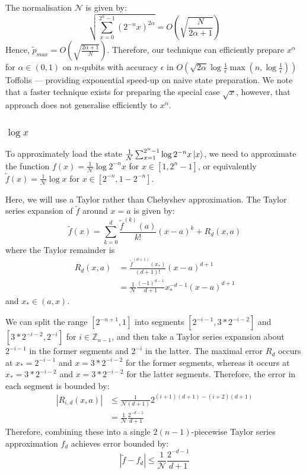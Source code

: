 \documentclass[a4paper,twocolumn,,accepted=2025-05-27]{quantumarticle}
\theoremstyle{empty}
\begin{document}
The normalisation $\mathcal{N}$ is given by:
\begin{equation}
    \sqrt{\sum_{x=0}^{2^n-1}(2^{-n} x)^{2\alpha}}  = O\left(\sqrt{\frac{N}{2\alpha+1}}\right)
\end{equation}
Hence, $\tilde{p}_{max} = O\left(\sqrt{\frac{2\alpha+1}{N}
}\right)$. Therefore, our technique can efficiently prepare $x^{\alpha}$ for $\alpha \in (0,1)$ on $n$-qubits with accuracy $\epsilon$ in $O(\sqrt{2\alpha} \log \frac{1}{\epsilon}\max(n, \log\frac{1}{\epsilon}))$ Toffolis --- providing exponential speed-up on naive state preparation. We note that a faster technique \cite{PhysRevLett.122.020502} exists for preparing the special case $\sqrt{x}$, however, that approach does not generalise efficiently to $x^{\alpha}$.

\subsubsection{$\log x$}
\label{section:inverse} To approximately load the state $\frac{1}{\mathcal{N}}\sum_{x=1}^{2^n-1} \log{2^{-n}x}\ket{x}$, we need to approximate the function $f(x) = \frac{1}{\mathcal{N}}\log{2^{-n}x}$ for $x \in [1, 2^n-1]$, or equivalently $\tilde f(x) =\frac{1}{\mathcal{N}}\log{x}$ for $x \in [2^{-n}, 1-2^{-n}]$. 

Here, we will use a Taylor rather than Chebyshev approximation. The Taylor series expansion of $\tilde f$ around $x=a$ is given by:
\begin{equation}
        \tilde f(x) = \sum_{k=0}^d \frac{\tilde{f}^{(k)}(a)}{k!}(x-a)^k + R_d(x,a)
\end{equation}
where the Taylor remainder is
\begin{align}
    R_d(x,a) &= \frac{\tilde{f}^{(d+1)}(x_*)}{(d+1)!}(x-a)^{d+1} \nonumber \\
            &= \frac{1}{\mathcal{N}} \frac{(-1)^{d-1}}{d+1} x_*^{-d-1}(x-a)^{d+1}
\end{align}
and $x_* \in (a,x)$.

We can split the range $[2^{-n+1}, 1]$ into segments $[2^{-i-1}, 3*2^{-i-2}]$ and $[3*2^{-i-2}, 2^{-i}]$ for $i \in \mathbb{Z}_{n-1}$, and then take a Taylor series expansion about $2^{-i-1}$ in the former segments and $2^{-i}$ in the latter. The maximal error $R_d$ occurs at $x_* = 2^{-i-1}$ and $x=3*2^{-i-2}$ for the former segments, whereas it occurs at $x_* = 3*2^{-i-2}$ and $x=3*2^{-i-2}$ for the latter segments. Therefore, the error in each segment is bounded by:
\begin{align}
    |R_{i,d}(x,a)| &\leq \frac{1}{\mathcal{N}(d+1)}  2^{(i+1)(d+1)-(i+2)(d+1)} \nonumber\\
                &= \frac{1}{\mathcal{N}} \frac{2^{-d-1}}{d+1}
\end{align}
Therefore, combining these into a single $2(n-1)$-piecewise Taylor series approximation $f_d$ achieves error bounded by:
\begin{equation}
     |\tilde f - f_{d}| \leq   \frac{1}{\mathcal{N}} \frac{2^{-d-1}}{d+1}
\end{equation}
\end{document}
